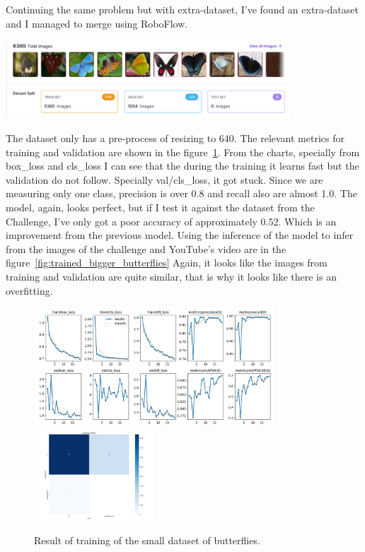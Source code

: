 \documentclass{cpsc202}
\begin{document}
    Continuing the same problem but with extra-dataset, I've found an extra-dataset and I managed to merge using RoboFlow.
    \begin{center}
        \includegraphics[width=0.8\textwidth]{trained_bigger_butterflies/dataset_enhanced}
    \end{center}
    The dataset only has a pre-process of resizing to 640.
    The relevant metrics for training and validation are shown in the figure~\ref{fig:results-big}.
    From the charts, specially from box\_loss and cls\_loss I can see that the during the training it learns fast but the validation do not follow.
    Specially val/cls\_loss, it got stuck.
    Since we are measuring only one class, precision is over 0.8 and recall also are almost 1.0.
    The model, again,  looks perfect, but if I test it against the dataset from the Challenge, I've only got a poor accuracy of approximately 0.52.
    Which is an improvement from the previous model.
    Using the inference of the model to infer from the images of the challenge and YouTube's video are in the figure~\ref{fig:trained_bigger_butterflies}
    Again, it looks like the images from training and validation are quite similar, that is why it looks like there is an overfitting.
    \begin{figure}
        \begin{center}
            \includegraphics[width=0.8\textwidth]{trained_bigger_butterflies/results}
            \includegraphics[width=0.4\textwidth]{trained_bigger_butterflies/confusion_matrix}
        \end{center}
        \caption{Result of training of the small dataset of butterflies.}
        \label{fig:results-big}
    \end{figure}
\end{document}
